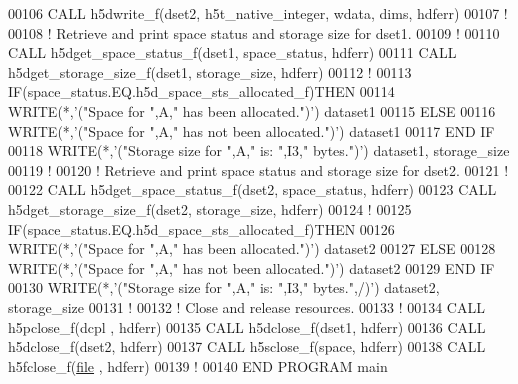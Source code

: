 \begin{DoxyCode}
00106   \textcolor{keyword}{CALL }h5dwrite\_f(dset2, h5t\_native\_integer, wdata, dims, hdferr)
00107   \textcolor{comment}{!}
00108   \textcolor{comment}{! Retrieve and print space status and storage size for dset1.}
00109   \textcolor{comment}{!}
00110   \textcolor{keyword}{CALL }h5dget\_space\_status\_f(dset1, space\_status, hdferr)
00111   \textcolor{keyword}{CALL }h5dget\_storage\_size\_f(dset1, storage\_size, hdferr)
00112   \textcolor{comment}{!}
00113   \textcolor{keywordflow}{IF}(space\_status.EQ.h5d\_space\_sts\_allocated\_f)\textcolor{keywordflow}{THEN}
00114      \textcolor{keyword}{WRITE}(*,\textcolor{stringliteral}{'("Space for ",A," has been allocated.")'}) dataset1
00115   \textcolor{keywordflow}{ELSE}
00116      \textcolor{keyword}{WRITE}(*,\textcolor{stringliteral}{'("Space for ",A," has not been allocated.")'}) dataset1
00117 \textcolor{keywordflow}{  END IF}
00118   \textcolor{keyword}{WRITE}(*,\textcolor{stringliteral}{'("Storage size for ",A," is: ",I3," bytes.")'}) dataset1, storage\_size
00119   \textcolor{comment}{!}
00120   \textcolor{comment}{! Retrieve and print space status and storage size for dset2.}
00121   \textcolor{comment}{!}
00122   \textcolor{keyword}{CALL }h5dget\_space\_status\_f(dset2, space\_status, hdferr)
00123   \textcolor{keyword}{CALL }h5dget\_storage\_size\_f(dset2, storage\_size, hdferr)
00124   \textcolor{comment}{!}
00125   \textcolor{keywordflow}{IF}(space\_status.EQ.h5d\_space\_sts\_allocated\_f)\textcolor{keywordflow}{THEN}
00126      \textcolor{keyword}{WRITE}(*,\textcolor{stringliteral}{'("Space for ",A," has been allocated.")'}) dataset2
00127   \textcolor{keywordflow}{ELSE}
00128      \textcolor{keyword}{WRITE}(*,\textcolor{stringliteral}{'("Space for ",A," has not been allocated.")'}) dataset2
00129 \textcolor{keywordflow}{  END IF}
00130   \textcolor{keyword}{WRITE}(*,\textcolor{stringliteral}{'("Storage size for ",A," is: ",I3," bytes.",/)'}) dataset2, storage\_size
00131   \textcolor{comment}{!}
00132   \textcolor{comment}{! Close and release resources.}
00133   \textcolor{comment}{!}
00134   \textcolor{keyword}{CALL }h5pclose\_f(dcpl , hdferr)
00135   \textcolor{keyword}{CALL }h5dclose\_f(dset1, hdferr)
00136   \textcolor{keyword}{CALL }h5dclose\_f(dset2, hdferr)
00137   \textcolor{keyword}{CALL }h5sclose\_f(space, hdferr)
00138   \textcolor{keyword}{CALL }h5fclose\_f(\hyperlink{structfile}{file} , hdferr)
00139   \textcolor{comment}{!}
00140 \textcolor{keyword}{END PROGRAM }main
\end{DoxyCode}
